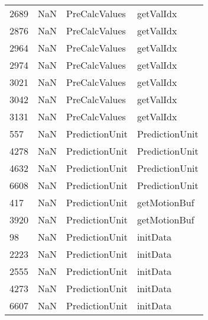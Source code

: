 \begin{tabular}{llll}
2689 &                   NaN &              PreCalcValues &                                 getValIdx \\
2876 &                   NaN &              PreCalcValues &                                 getValIdx \\
2964 &                   NaN &              PreCalcValues &                                 getValIdx \\
2974 &                   NaN &              PreCalcValues &                                 getValIdx \\
3021 &                   NaN &              PreCalcValues &                                 getValIdx \\
3042 &                   NaN &              PreCalcValues &                                 getValIdx \\
3131 &                   NaN &              PreCalcValues &                                 getValIdx \\
557  &                   NaN &             PredictionUnit &                            PredictionUnit \\
4278 &                   NaN &             PredictionUnit &                            PredictionUnit \\
4632 &                   NaN &             PredictionUnit &                            PredictionUnit \\
6608 &                   NaN &             PredictionUnit &                            PredictionUnit \\
417  &                   NaN &             PredictionUnit &                              getMotionBuf \\
3920 &                   NaN &             PredictionUnit &                              getMotionBuf \\
98   &                   NaN &             PredictionUnit &                                  initData \\
2223 &                   NaN &             PredictionUnit &                                  initData \\
2555 &                   NaN &             PredictionUnit &                                  initData \\
4273 &                   NaN &             PredictionUnit &                                  initData \\
6607 &                   NaN &             PredictionUnit &                                  initData \\

\end{tabular}
